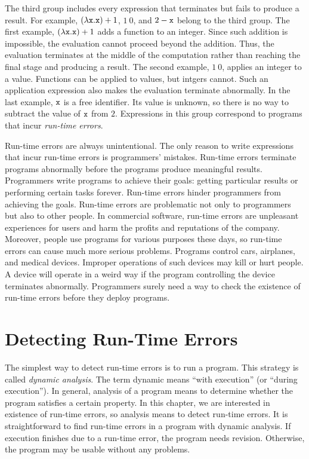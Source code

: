 The third group includes every expression that terminates but fails to produce
a result. For example, $(\lambda \texttt{x}.\texttt{x})+1$, $1\ 0$, and $2-\texttt{x}$
belong to the third group. The first example, $(\lambda \texttt{x}.\texttt{x})+1$
adds a function to an integer. Since such addition is impossible, the evaluation
cannot proceed beyond the addition. Thus, the evaluation terminates at the
middle of the computation rather than reaching the final stage and producing a
result. The second example, $1\ 0$, applies an integer to a value. Functions can
be applied to values, but intgers cannot. Such an application expression also
makes the evaluation terminate abnormally. In the last example, $\texttt{x}$ is a free
identifier. Its value is unknown, so there is no way to subtract the value of
$\texttt{x}$ from $2$. Expressions in this group correspond to programs that incur
\textit{run-time errors}.

Run-time errors are always unintentional. The only reason to write expressions
that incur run-time errors is programmers' mistakes. Run-time errors terminate
programs abnormally before the programs produce meaningful results. Programmers
write programs to achieve their goals: getting particular results or performing
certain tasks forever. Run-time errors hinder programmers from achieving the
goals. Run-time errors are problematic not only to programmers but also to other
people. In commercial software, run-time errors are unpleasant experiences for users
and harm the profits and reputations of the company. Moreover,
people use programs for various purposes these days, so run-time errors can
cause much more serious problems. Programs control cars, airplanes, and medical
devices. Improper operations of such devices may kill or hurt people. A device
will operate in a weird way if the program controlling the device terminates abnormally.
Programmers surely need a way to check the existence of run-time errors before
they deploy programs.

\section{Detecting Run-Time Errors}

The simplest way to detect run-time errors is to run a program. This strategy is
called \textit{dynamic analysis}. The term dynamic
means ``with execution'' (or ``during execution''). In general, analysis of a
program means to determine whether the program satisfies a certain property. In
this chapter, we are interested in existence of run-time errors, so analysis
means to detect run-time errors.
It is straightforward to find run-time errors in a
program with dynamic analysis. If execution finishes due to a
run-time error, the program needs revision. Otherwise, the program may
be usable without any problems.

